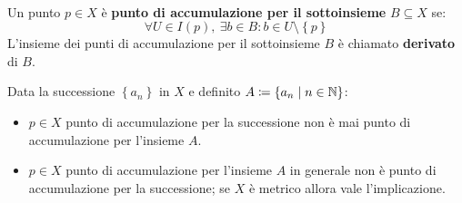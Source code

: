 \begin{define}~{}\\
	Un punto $p\in X$ è \textbf{punto di accumulazione per il sottoinsieme} $B\subseteq X$ se:
	\begin{equation}
		\forall U\in I\left(p\right),\ \exists b\in B \colon b\in U\setminus \left\{ p\right\}
	\end{equation}
L'insieme dei punti di accumulazione per il sottoinsieme $B$ è chiamato \textbf{derivato} di $B$.
\end{define}
\begin{exercise}
Data la successione $\left\{a_n\right\}$ in $X$ e definito $A\coloneqq \{a_n\mid n\in\mathbb{N}\}$:
\begin{itemize}
\item $p\in X$ punto di accumulazione per la successione non è mai punto di accumulazione per l'insieme $A$.
\item $p\in X$ punto di accumulazione per l'insieme $A$ in generale non è punto di accumulazione per la successione; se $X$ è metrico allora vale l'implicazione.
\end{itemize}
\vspace{-3mm}
\end{exercise}
